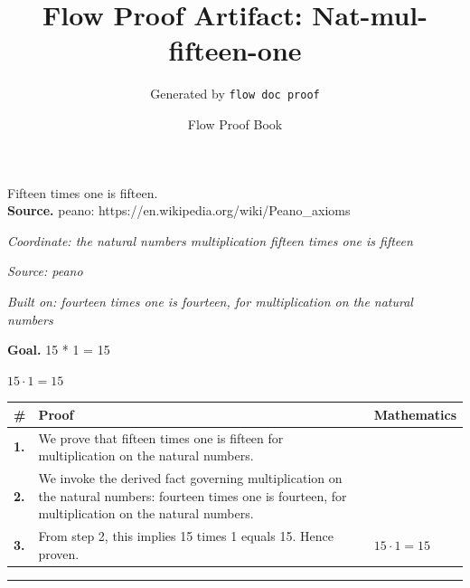 \documentclass[11pt]{article}
\title{Flow Proof Artifact: Nat-mul-fifteen-one}
\author{Generated by \texttt{flow doc proof}}
\date{Flow Proof Book}
\theoremstyle{definition}
\begin{document}
\maketitle
Fifteen times one is fifteen.\\[0.5em]
\textbf{Source.} peano: https://en.wikipedia.org/wiki/Peano\_axioms\\[0.5em]
\bigskip
{}\par
\smallskip\noindent\textit{Coordinate: the natural numbers \cdot multiplication \cdot fifteen times one is fifteen}\par
\smallskip\noindent\textit{Source: peano}\par
\smallskip\noindent\textit{Built on: fourteen times one is fourteen, for multiplication on the natural numbers}\par
\medskip
\noindent\textbf{Goal.} 15 * 1 = 15\par
\noindent$\displaystyle 15 \cdot 1 = 15$\par
\medskip
\noindent
\begin{tabular}{@{} >{\raggedright\arraybackslash}p{} >{\raggedright\arraybackslash}p{} >{\raggedleft\arraybackslash}p{} @{}}
\textbf{\#} & \textbf{Proof} & \textbf{Mathematics} \\
\midrule
\textbf{1.} & We prove that fifteen times one is fifteen for multiplication on the natural numbers. & \\[0.45em]
\textbf{2.} & We invoke the derived fact governing multiplication on the natural numbers: fourteen times one is fourteen, for multiplication on the natural numbers. & \\[0.45em]
\textbf{3.} & From step 2, this implies 15 times 1 equals 15. Hence proven. & $\displaystyle 15 \cdot 1 = 15$ \\[0.45em]
\bottomrule
\end{tabular}
\label{thm:Nat-multiplication-fifteen_times_one_is_fifteen}
\par\medskip\hrule
\end{document}

